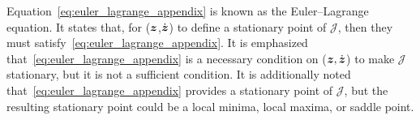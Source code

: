 \documentclass[3p,computermodern,10pt]{elsarticle}
\begin{document}
\begin{appendices}
Equation~\eqref{eq:euler_lagrange_appendix} is known as the Euler--Lagrange
equation. It states that, for ($\boldsymbol z$,$\dot{\boldsymbol z}$) to define a stationary point of $\mathcal{J}$, then they must 
satisfy~\eqref{eq:euler_lagrange_appendix}. It is emphasized
that~\eqref{eq:euler_lagrange_appendix} is a necessary condition on ($\boldsymbol z,\dot{\boldsymbol z}$)
to make $\mathcal{J}$ stationary, but it is not a sufficient condition. It is
additionally noted that~\eqref{eq:euler_lagrange_appendix} provides a
stationary point of $\mathcal{J}$, but the resulting stationary point could be a local minima, local maxima, or saddle point.


\end{appendices}
\end{document}
